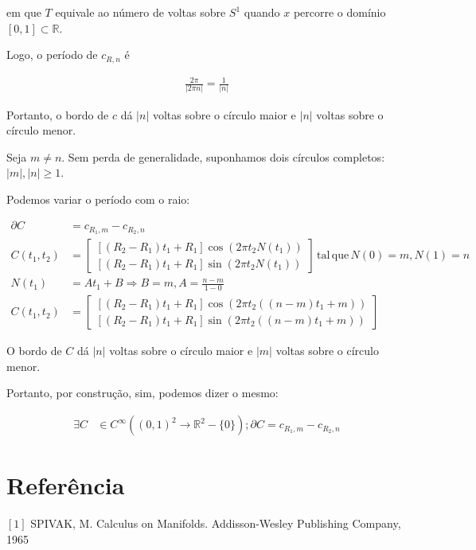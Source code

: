\documentclass[12pt,a4paper]{article}
\begin{document}
		em que $T$ equivale ao n\'umero de voltas sobre $S^1$ quando $x$ percorre o dom\'inio $[0, 1] \subset \mathbb{R}$.

		Logo, o per\'iodo de $c_{R,n}$ \'e

		\begin{align}
			\frac{2 \pi}{|2 \pi n|} = \frac{1}{|n|}
		\end{align}

		Portanto, o bordo de $c$ d\'a $|n|$ voltas sobre o c\'irculo maior e $|n|$ voltas sobre o c\'irculo menor.

		Seja $m \neq n$. Sem perda de generalidade, suponhamos dois c\'irculos completos: $|m|, |n| \ge 1$.

		Podemos variar o per\'iodo com o raio:

		\begin{align}
			\partial C &= c_{R_1,m} - c_{R_2,n} \\
			C(t_1, t_2) &= \begin{bmatrix} [(R_2 - R_1) t_1 + R_1] \cos(2\pi t_2 N(t_1)) \\ [(R_2 - R_1) t_1 + R_1]  \sin(2\pi t_2 N(t_1)) \end{bmatrix} \mathrm{\,tal\,que\,} N(0) = m, N(1) = n \\
			N(t_1) &= A t_1 + B \Rightarrow B = m, A = \frac{n - m}{1 - 0} \\
			C(t_1, t_2) &= \begin{bmatrix} [(R_2 - R_1) t_1 + R_1] \cos(2\pi t_2 ((n - m) t_1 + m)) \\ [(R_2 - R_1) t_1 + R_1]  \sin(2\pi t_2 ((n - m) t_1 + m)) \end{bmatrix}
		\end{align}

		O bordo de $C$ d\'a $|n|$ voltas sobre o c\'irculo maior e $|m|$ voltas sobre o c\'irculo menor.

		Portanto, por constru\c{c}\~ao, sim, podemos dizer o mesmo:

		\begin{align}
			\exists C &\in C^\infty( (0,1)^2 \rightarrow \mathbb{R}^2 - \{0\} ) ; \partial C = c_{R_1,m} - c_{R_2,n}
		\end{align}

	\section{Refer\^encia}

		$[1]$ SPIVAK, M. Calculus on Manifolds. Addisson-Wesley Publishing Company, 1965
\end{document}
